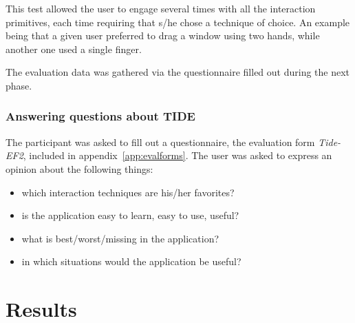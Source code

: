 This test allowed the user to engage several times with all the interaction primitives, each time requiring that s/he chose a technique of choice.
An example being that a given user preferred to drag a window using two hands, while another one used a single finger.

The evaluation data was gathered via the questionnaire filled out during the next phase.

\subsubsection{Answering questions about TIDE}

The participant was asked to fill out a questionnaire, the evaluation form \emph{Tide-EF2}, included in appendix~\ref{app:evalforms}.
The user was asked to express an opinion about the following things:
\begin{itemize}
\item which interaction techniques are his/her favorites?
\item is the application easy to learn, easy to use, useful?
\item what is best/worst/missing in the application?
\item in which situations would the application be useful? 
\end{itemize}



\clearpage
\section{Results}
\label{sec:results}

